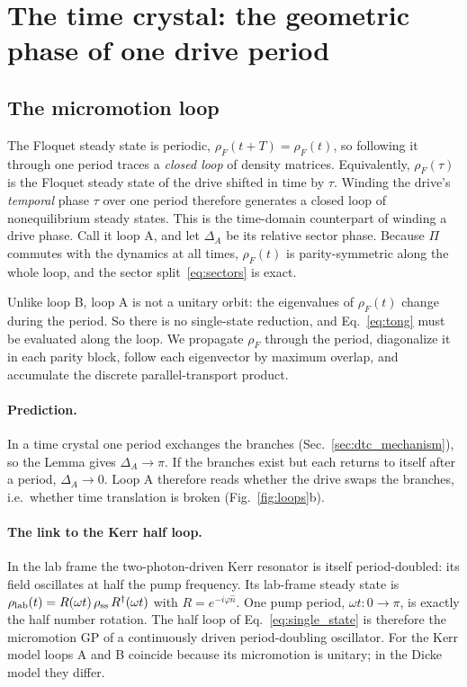 \documentclass[11pt,a4paper]{article}
\begin{document}
\section{The time crystal: the geometric phase of one drive period}\label{sec:loopA}

\subsection{The micromotion loop}

The Floquet steady state is periodic, $\rho_F(t+T)=\rho_F(t)$, so following it through one
period traces a \emph{closed loop} of density matrices. Equivalently, $\rho_F(\tau)$ is the
Floquet steady state of the drive shifted in time by $\tau$. Winding the drive's \emph{temporal}
phase $\tau$ over one period therefore generates a closed loop of nonequilibrium steady states.
This is the time-domain counterpart of winding a drive phase. Call it loop A, and let $\Delta_A$
be its relative sector phase. Because $\Pi$ commutes with the dynamics at all times, $\rho_F(t)$
is parity-symmetric along the whole loop, and the sector split~\eqref{eq:sectors} is exact.

Unlike loop B, loop A is not a unitary orbit: the eigenvalues of $\rho_F(t)$ change during the
period. So there is no single-state reduction, and Eq.~\eqref{eq:tong} must be evaluated along
the loop. We propagate $\rho_F$ through the period, diagonalize it in each parity block, follow
each eigenvector by maximum overlap, and accumulate the discrete parallel-transport product.

\paragraph{Prediction.} In a time crystal one period exchanges the branches
(Sec.~\ref{sec:dtc_mechanism}), so the Lemma gives $\Delta_A\to\pi$. If the branches exist but
each returns to itself after a period, $\Delta_A\to0$. Loop A therefore reads whether the drive
swaps the branches, i.e.\ whether time translation is broken (Fig.~\ref{fig:loops}b).

\paragraph{The link to the Kerr half loop.} In the lab frame the two-photon-driven Kerr resonator
is itself period-doubled: its field oscillates at half the pump frequency. Its lab-frame steady
state is $\rho_{\rm lab}(t)=R(\omega t)\,\rho_{\rm ss}\,R^\dagger(\omega t)$ with
$R=e^{-i\varphi\hat n}$. One pump period, $\omega t:0\to\pi$, is exactly the half number rotation.
The half loop of Eq.~\eqref{eq:single_state} is therefore the micromotion GP of a continuously
driven period-doubling oscillator. For the Kerr model loops A and B coincide because its
micromotion is unitary; in the Dicke model they differ.
\end{document}
